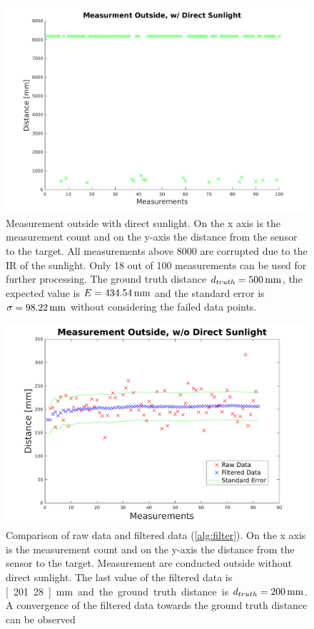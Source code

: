 \begin{figure}
	\centering
	\includegraphics[width=0.9\linewidth]{pictures/plot_meas_out.pdf}
	\caption{Measurement outside with direct sunlight. On the x axis is the measurement count and on the y-axis the distance from the sensor to the target. All measurements above 8000 are corrupted due to the IR of the sunlight. Only 18 out of 100 measurements can be used for further processing. The ground truth distance $d_{truth}=\unit[500]{mm}$, the expected value is $E=\unit[434.54]{mm}$ and the standard error is $\sigma=\unit[98.22]{mm}$ without considering the failed data points.}
	\label{fig:meas_out_sun}
\end{figure}

\begin{figure}
	\centering
	\includegraphics[width=0.9\linewidth]{pictures/plot_filter_shadow.pdf}
	\caption{Comparison of raw data and filtered data (\cref{alg:filter}). On the x axis is the measurement count and on the y-axis the distance from the sensor to the target. Measurement are conducted outside without direct sunlight. The last value of the filtered data is \unit[201.28]{mm} and the ground truth distance is $d_{truth}=\unit[200]{mm}$. A convergence of the filtered data towards the ground truth distance can be observed}
	\label{fig:meas_out_shadow filter}
\end{figure}

